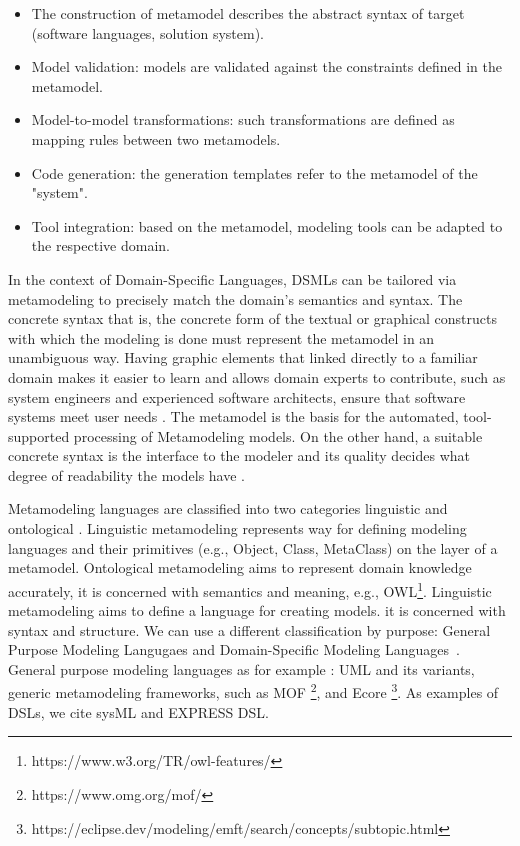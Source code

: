 \begin{itemize}
\item The construction of metamodel describes the abstract syntax of target (software languages, solution system).
\item Model validation: models are validated against the constraints defined in the metamodel. 
\item Model-to-model transformations: such transformations are defined as mapping rules between two metamodels.
\item Code generation: the generation templates refer to the metamodel of the "system". 
\item Tool integration: based on the metamodel, modeling tools can be adapted to the respective domain. 
\end{itemize}


In the context of Domain-Specific Languages, DSMLs can be tailored via metamodeling to precisely match the domain's semantics and syntax. The concrete syntax that is, the concrete form of the textual or graphical constructs with which the modeling is done must represent the metamodel in an unambiguous way. Having graphic elements that linked directly to a familiar domain makes it easier to learn and allows domain  experts to contribute, such as system engineers and experienced software architects, ensure that software systems meet user needs \cite{volter2013model}. The metamodel is the basis for the automated, tool-supported processing of Metamodeling models. On the other hand, a suitable concrete syntax is the interface to the modeler and its quality decides what degree of readability the models have \cite{stahl2006model}.




Metamodeling languages are classified into two categories linguistic and ontological \cite{gavsevic2007metamodeling}. Linguistic metamodeling represents  way for defining modeling languages and their primitives (e.g., Object, Class, MetaClass) on the layer of a metamodel. Ontological metamodeling aims to represent domain knowledge accurately, it is concerned with semantics and meaning, e.g., OWL\footnote{https://www.w3.org/TR/owl-features/}. Linguistic metamodeling aims to define a language for creating models. it is concerned with syntax and structure.
We can use a different classification by purpose: General Purpose Modeling Langugaes and Domain-Specific Modeling Languages~\cite{de2012domain}. General purpose modeling languages as for example : UML and its variants, generic metamodeling frameworks, such as MOF \footnote{https://www.omg.org/mof/}, and Ecore \footnote{https://eclipse.dev/modeling/emft/search/concepts/subtopic.html}. As examples of DSLs, we cite sysML and EXPRESS DSL.

